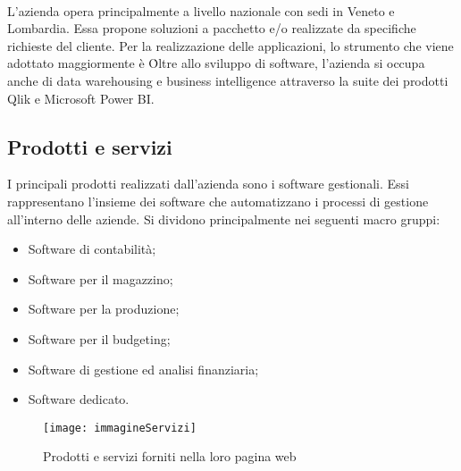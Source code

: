 
\paragraph*{}L'azienda opera principalmente a livello nazionale con sedi in Veneto e Lombardia. Essa propone soluzioni a pacchetto e/o realizzate da specifiche richieste del cliente. Per la realizzazione delle applicazioni, lo strumento che viene adottato maggiormente è \inde\.
Oltre allo sviluppo di software, l'azienda si occupa anche di data warehousing e business intelligence attraverso la suite dei prodotti Qlik e Microsoft Power BI.


\subsection{Prodotti e servizi}
\label{cap1:Prodotti e servizi}
I principali prodotti realizzati dall'azienda sono i software gestionali. Essi rappresentano l'insieme dei software che automatizzano i processi di gestione all'interno delle aziende. Si dividono principalmente nei seguenti macro gruppi:
\begin{itemize}
	\item Software di contabilità;
	\item Software per il magazzino;
	\item Software per la produzione;
	\item Software per il budgeting;
	\item Software di gestione ed analisi finanziaria;
	\item Software dedicato.
\end{itemize}

\begin{figure}[!h] 
	\centering 
	\texttt{[image: immagineServizi]} 
	\caption{Prodotti e servizi forniti nella loro pagina web}
\end{figure}

